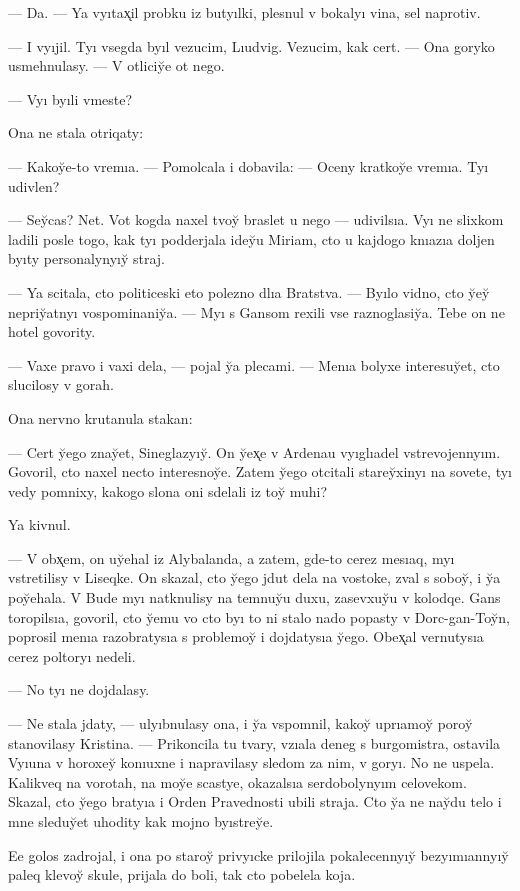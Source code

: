 \documentclass[10pt]{book}
\begin{document}
— Da. — Ya vyıtax̨il probku iz butyılki, plesnul v bokalyı vina, sel naprotiv.

— I vyıjil. Tyı vsegda byıl vezucim, Lıudvig. Vezucim, kak cert. — Ona goryko usmehnulasy. — V otliciy̆e ot nego.

— Vyı byıli vmeste?

Ona ne stala otriqaty:

— Kakoy̆e-to vremıa. — Pomolcala i dobavila: — Oceny kratkoy̆e vremıa. Tyı udivlen?

— Sey̆cas? Net. Vot kogda naxel tvoy̆ braslet u nego — udivilsıa. Vyı ne slixkom ladili posle togo, kak tyı podderjala idey̆u Miriam, cto u kajdogo knıazıa doljen byıty personalynyıy̆ straj.

— Ya scitala, cto politiceski eto polezno dlıa Bratstva. — Byılo vidno, cto y̆ey̆ nepriy̆atnyı vospominaniy̆a. — Myı s Gansom rexili vse raznoglasiy̆a. Tebe on ne hotel govority.

— Vaxe pravo i vaxi dela, — pojal y̆a plecami. — Menıa bolyxe interesuy̆et, cto slucilosy v gorah.

Ona nervno krutanula stakan:

— Cert y̆ego znay̆et, Sineglazyıy̆. On y̆ex̨e v Ardenau vyıglıadel vstrevojennyım. Govoril, cto naxel necto interesnoy̆e. Zatem y̆ego otcitali starey̆xinyı na sovete, tyı vedy pomnixy, kakogo slona oni sdelali iz toy̆ muhi?

Ya kivnul.

— V obx̨em, on uy̆ehal iz Alybalanda, a zatem, gde-to cerez mesıaq, myı vstretilisy v Liseqke. On skazal, cto y̆ego jdut dela na vostoke, zval s soboy̆, i y̆a poy̆ehala. V Bude myı natknulisy na temnuy̆u duxu, zasevxuy̆u v kolodqe. Gans toropilsıa, govoril, cto y̆emu vo cto byı to ni stalo nado popasty v Dorc-gan-Toy̆n, poprosil menıa razobratysıa s problemoy̆ i dojdatysıa y̆ego. Obex̨al vernutysıa cerez poltoryı nedeli.

— No tyı ne dojdalasy.

— Ne stala jdaty, — ulyıbnulasy ona, i y̆a vspomnil, kakoy̆ uprıamoy̆ poroy̆ stanovilasy Kristina. — Prikoncila tu tvary, vzıala deneg s burgomistra, ostavila Vyıuna v horoxey̆ konıuxne i napravilasy sledom za nim, v goryı. No ne uspela. Kalikveq na vorotah, na moy̆e scastye, okazalsıa serdobolynyım celovekom. Skazal, cto y̆ego bratyıa i Orden Pravednosti ubili straja. Cto y̆a ne nay̆du telo i mne sleduy̆et uhodity kak mojno byıstrey̆e.

Ee golos zadrojal, i ona po staroy̆ privyıcke prilojila pokalecennyıy̆ bezyımıannyıy̆ paleq klevoy̆ skule, prijala do boli, tak cto pobelela koja.
\end{document}
